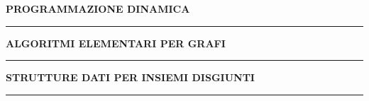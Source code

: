 \documentclass[8pt]{extarticle}
\newenvironment{formulario}
{
\setlength{\columnsep}{3em}
\twocolumn
\lstset{tabsize=3}
\begin{spacing}{1}
\begin{flushleft}
}{
\end{flushleft}
\end{spacing}
}
\newenvironment{tcenter}{
  \par
  \centering
  \setlength{\parskip}{0pt} %
  \noindent
}{
  \par
}
\newenvironment{myParagraph}[1]
{
\begin{tcenter}
\textbf{#1}
\end{tcenter}
}{
\myRule
}
\newcommand{\myRule}{\rule{250pt}{0.1pt}}
\begin{document}
\begin{formulario}
\begin{myParagraph}{PROGRAMMAZIONE DINAMICA}
	
	
	
	
	
	
	
	
	
	
	
	

	\end{myParagraph}
	
	\begin{myParagraph}{ALGORITMI ELEMENTARI PER GRAFI}
	\end{myParagraph}
	\begin{myParagraph}{STRUTTURE DATI PER INSIEMI DISGIUNTI}
	\end{myParagraph}
\end{formulario}
\end{document}
